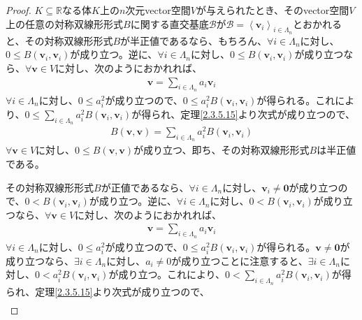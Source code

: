 \documentclass[dvipdfmx]{jsarticle}
\begin{document}
\begin{proof}
$K \subseteq \mathbb{R}$なる体$K$上の$n$次元vector空間$V$が与えられたとき、そのvector空間$V$上の任意の対称双線形形式$B$に関する直交基底$\mathcal{B}$が$\mathcal{B} =\left\langle \mathbf{v}_{i} \right\rangle_{i \in \varLambda_{n}}$とおかれると、その対称双線形形式$B$が半正値であるなら、もちろん、$\forall i \in \varLambda_{n}$に対し、$0 \leq B\left( \mathbf{v}_{i},\mathbf{v}_{i} \right)$が成り立つ。逆に、$\forall i \in \varLambda_{n}$に対し、$0 \leq B\left( \mathbf{v}_{i},\mathbf{v}_{i} \right)$が成り立つなら、$\forall\mathbf{v} \in V$に対し、次のようにおかれれば、
\begin{align*}
\mathbf{v} = \sum_{i \in \varLambda_{n}} {a_{i}\mathbf{v}_{i}}
\end{align*}
$\forall i \in \varLambda_{n}$に対し、$0 \leq a_{i}^{2}$が成り立つので、$0 \leq a_{i}^{2}B\left( \mathbf{v}_{i},\mathbf{v}_{i} \right)$が得られる。これにより、$0 \leq \sum_{i \in \varLambda_{n}} {a_{i}^{2}B\left( \mathbf{v}_{i},\mathbf{v}_{i} \right)}$が得られ、定理\ref{2.3.5.15}より次式が成り立つので、
\begin{align*}
B\left( \mathbf{v},\mathbf{v} \right) = \sum_{i \in \varLambda_{n}} {a_{i}^{2}B\left( \mathbf{v}_{i},\mathbf{v}_{i} \right)}
\end{align*}
$\forall\mathbf{v} \in V$に対し、$0 \leq B\left( \mathbf{v},\mathbf{v} \right)$が成り立つ、即ち、その対称双線形形式$B$は半正値である。\par
その対称双線形形式$B$が正値であるなら、$\forall i \in \varLambda_{n}$に対し、$\mathbf{v}_{i} \neq \mathbf{0}$が成り立つので、$0 < B\left( \mathbf{v}_{i},\mathbf{v}_{i} \right)$が成り立つ。逆に、$\forall i \in \varLambda_{n}$に対し、$0 < B\left( \mathbf{v}_{i},\mathbf{v}_{i} \right)$が成り立つなら、$\forall\mathbf{v} \in V$に対し、次のようにおかれれば、
\begin{align*}
\mathbf{v} = \sum_{i \in \varLambda_{n}} {a_{i}\mathbf{v}_{i}}
\end{align*}
$\forall i \in \varLambda_{n}$に対し、$0 \leq a_{i}^{2}$が成り立つので、$0 \leq a_{i}^{2}B\left( \mathbf{v}_{i},\mathbf{v}_{i} \right)$が得られる。$\mathbf{v} \neq \mathbf{0}$が成り立つなら、$\exists i \in \varLambda_{n}$に対し、$a_{i} \neq 0$が成り立つことに注意すると、$\exists i \in \varLambda_{n}$に対し、$0 < a_{i}^{2}B\left( \mathbf{v}_{i},\mathbf{v}_{i} \right)$が成り立つ。これにより、$0 < \sum_{i \in \varLambda_{n}} {a_{i}^{2}B\left( \mathbf{v}_{i},\mathbf{v}_{i} \right)}$が得られ、定理\ref{2.3.5.15}より次式が成り立つので、
\begin{align*}

\end{align*}
\end{proof}
\end{document}

